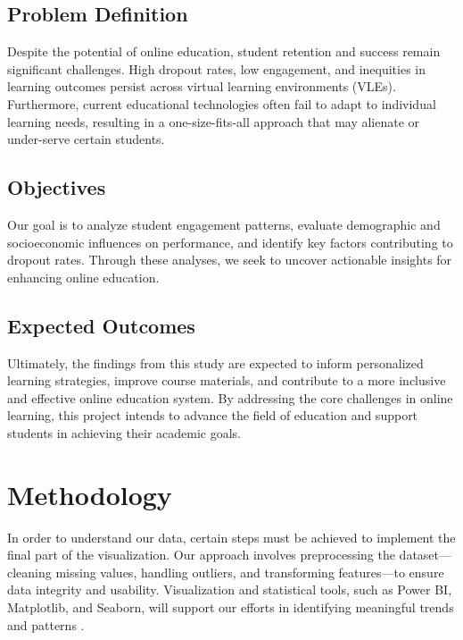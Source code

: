 \subsection*{Problem Definition}

Despite the potential of online education, student retention and success remain significant challenges. High dropout rates, low engagement, and inequities in learning outcomes persist across virtual learning environments (VLEs). Furthermore, current educational technologies often fail to adapt to individual learning needs, resulting in a one-size-fits-all approach that may alienate or under-serve certain students.

\subsection*{Objectives}

Our goal is to analyze student engagement patterns, evaluate demographic and socioeconomic influences on performance, and identify key factors contributing to dropout rates. Through these analyses, we seek to uncover actionable insights for enhancing online education.

\subsection*{Expected Outcomes}

Ultimately, the findings from this study are expected to inform personalized learning strategies, improve course materials, and contribute to a more inclusive and effective online education system. By addressing the core challenges in online learning, this project intends to advance the field of education and support students in achieving their academic goals.




\section{Methodology}

In order to understand our data, certain steps must be achieved to implement the final part of the visualization. Our approach involves preprocessing the dataset—cleaning missing values, handling outliers, and transforming features—to ensure data integrity and usability. Visualization and statistical tools, such as Power BI, Matplotlib, and Seaborn, will support our efforts in identifying meaningful trends and patterns \cite{Hunter2007, Waskom2021}.

